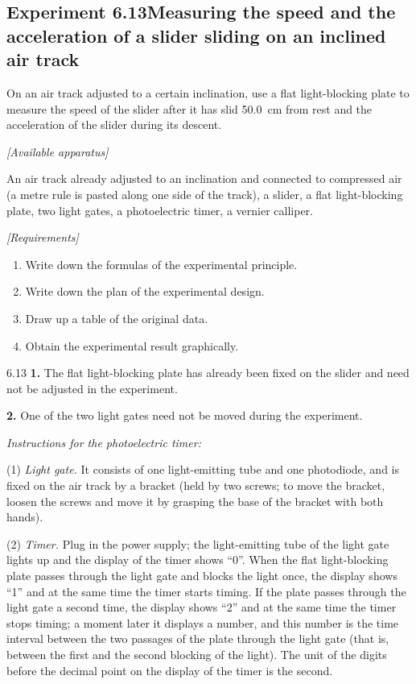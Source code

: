 ﻿\subsection*{Experiment 6.13\quad Measuring the speed and the acceleration of a slider sliding on an inclined air track}

On an air track adjusted to a certain inclination, use a flat light-blocking plate to measure the speed of the slider after it has slid \SI{50.0}{cm} from rest and the acceleration of the slider during its descent.

\noindent\textit{[Available apparatus]}

An air track already adjusted to an inclination and connected to compressed air (a metre rule is pasted along one side of the track), a slider, a flat light-blocking plate, two light gates, a photoelectric timer, a vernier calliper.

\noindent\textit{[Requirements]}
\begin{enumerate}[label=(\arabic*),leftmargin=2.2em,itemsep=1pt,topsep=2pt]
\item Write down the formulas of the experimental principle.
\item Write down the plan of the experimental design.
\item Draw up a table of the original data.
\item Obtain the experimental result graphically.
\end{enumerate}

\begin{hint}{6.13}
\textbf{1.} The flat light-blocking plate has already been fixed on the slider and need not be adjusted in the experiment.

\textbf{2.} One of the two light gates need not be moved during the experiment.
\end{hint}

\noindent\textit{Instructions for the photoelectric timer:}

(1) \textit{Light gate.} It consists of one light-emitting tube and one photodiode, and is fixed on the air track by a bracket (held by two screws; to move the bracket, loosen the screws and move it by grasping the base of the bracket with both hands).

(2) \textit{Timer.} Plug in the power supply; the light-emitting tube of the light gate lights up and the display of the timer shows ``0''. When the flat light-blocking plate passes through the light gate and blocks the light once, the display shows ``1'' and at the same time the timer starts timing. If the plate passes through the light gate a second time, the display shows ``2'' and at the same time the timer stops timing; a moment later it displays a number, and this number is the time interval between the two passages of the plate through the light gate (that is, between the first and the second blocking of the light). The unit of the digits before the decimal point on the display of the timer is the second.

